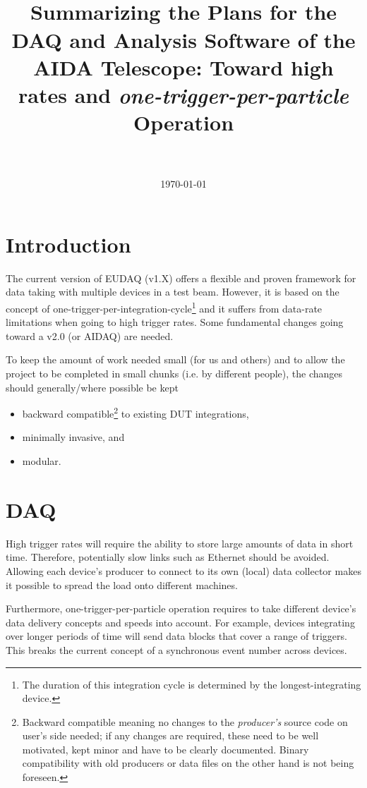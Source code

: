 \documentclass[paper=a4, fontsize=11pt]{scrartcl}	%
\title{
		\usefont{OT1}{bch}{b}{n}
		\horrule{0.5pt} \\[0.4cm]
		\huge Summarizing the Plans for the DAQ and
                Analysis Software of the AIDA Telescope: Toward high
                rates and
                \textit{one-trigger-per-particle} Operation\\
		\horrule{2pt} \\[0.5cm]
}
\author{}
\date{\today}
\numberwithin{equation}{section}		%
\numberwithin{figure}{section}			%
\numberwithin{table}{section}				%
\begin{document}
 

\maketitle
\section{Introduction}
The current version of EUDAQ (v1.X) offers a flexible and proven
framework for data taking with multiple devices in a test
beam. However, it is based on the concept of
one-trigger-per-integration-cycle\footnote{The duration of this
  integration cycle is determined by the longest-integrating device.}
and it suffers from data-rate limitations when going to high trigger
rates. Some fundamental changes going toward a v2.0 (or AIDAQ) are
needed.

To keep the amount of work needed small (for us and others) and to allow the project to
be completed in small chunks (i.e. by different people), the changes
should generally/where possible be kept
\begin{itemize}
\item backward compatible\footnote{Backward compatible meaning no
    changes to the \emph{producer's} source code on user's side needed; if any
    changes are required, these need to be well motivated, kept minor and
    have to be clearly documented. Binary compatibility with old producers or
    data files on the other hand is not being foreseen.} to existing DUT integrations,
\item minimally invasive, and
\item modular.
\end{itemize}

\section{DAQ}
\label{sec:daq}
High trigger rates will require the ability to store large amounts of
data in short time. Therefore, potentially slow links such as Ethernet
should be avoided. Allowing each device's producer to connect to its
own (local) data collector makes it possible to spread the load onto
different machines.

Furthermore, one-trigger-per-particle operation requires to take
different device's data delivery concepts and speeds into
account. For example, devices integrating over longer periods of time
will send data blocks that cover a range of triggers. This breaks the
current concept of a synchronous event number across devices.
\end{document}
